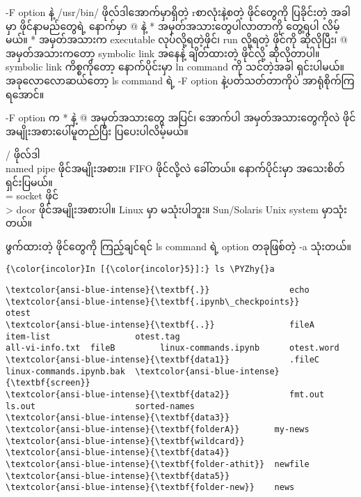 \documentclass[11pt]{article}
\def\PYZhy{\char`\-}
\begin{document}
    -F option နဲ့ /usr/bin/ ဖိုလ်ဒါအောက်မှာရှိတဲ့ rစာလုံးနဲ့စတဲ့ ဖိုင်တွေကို
ပြခိုင်းတဲ့ အခါမှာ ဖိုင်နာမည်တွေရဲ့ နောက်မှာ @ နဲ့ *
အမှတ်အသားတွေပါလာတာကို တွေ့ရပါ လိမ့်မယ်။ * အမှတ်အသားက executable
လုပ်လို့ရတဲ့ဖိုင်၊ run လို့ရတဲ့ ဖိုင်ကို ဆိုလိုပြီး၊ @ အမှတ်အသားကတော့
symbolic link အနေနဲ့ ချိတ်ထားတဲ့ ဖိုင်လို့ ဆိုလိုတာပါ။\\
symbolic link ကိစ္စကိုတော့ နောက်ပိုင်းမှာ ln command ကို သင်တဲ့အခါ
ရှင်းပါမယ်။ အခုလောလောဆယ်တော့ ls command ရဲ့ -F option နဲ့ပတ်သတ်တာကိုပဲ
အာရုံစိုက်ကြရအောင်။

-F option က * နဲ့ @ အမှတ်အသားတွေ အပြင်၊ အောက်ပါ အမှတ်အသားတွေကိုလဲ
ဖိုင်အမျိုးအစားပေါ်မူတည်ပြီး ပြပေးပါလိမ့်မယ်။

/ ဖိုလ်ဒါ\\
\textbar{} named pipe ဖိုင်အမျိုးအစား။ FIFO ဖိုင်လို့လဲ ခေါ်တယ်။
နောက်ပိုင်းမှာ အသေးစိတ်ရှင်းပြမယ်။\\
= socket ဖိုင်\\
\textgreater{} door ဖိုင်အမျိုးအစားပါ။ Linux မှာ မသုံးပါဘူး။ Sun/Solaris
Unix system မှာသုံးတယ်။

ဖွက်ထားတဲ့ ဖိုင်တွေကို ကြည့်ချင်ရင် ls command ရဲ့ option တခုဖြစ်တဲ့ -a
သုံးတယ်။

    \begin{Verbatim}[commandchars=\\\{\}]
{\color{incolor}In [{\color{incolor}5}]:} ls \PYZhy{}a
\end{Verbatim}

    \begin{Verbatim}[commandchars=\\\{\}]
\textcolor{ansi-blue-intense}{\textbf{.}}                echo          \textcolor{ansi-blue-intense}{\textbf{.ipynb\_checkpoints}}        otest
\textcolor{ansi-blue-intense}{\textbf{..}}               fileA         item-list                 otest.tag
all-vi-info.txt  fileB         linux-commands.ipynb      otest.word
\textcolor{ansi-blue-intense}{\textbf{data1}}            .fileC        linux-commands.ipynb.bak  \textcolor{ansi-blue-intense}{\textbf{screen}}
\textcolor{ansi-blue-intense}{\textbf{data2}}            fmt.out       ls.out                    sorted-names
\textcolor{ansi-blue-intense}{\textbf{data3}}            \textcolor{ansi-blue-intense}{\textbf{folderA}}       my-news                   \textcolor{ansi-blue-intense}{\textbf{wildcard}}
\textcolor{ansi-blue-intense}{\textbf{data4}}            \textcolor{ansi-blue-intense}{\textbf{folder-athit}}  newfile
\textcolor{ansi-blue-intense}{\textbf{data5}}            \textcolor{ansi-blue-intense}{\textbf{folder-new}}    news

    \end{Verbatim}
\end{document}
